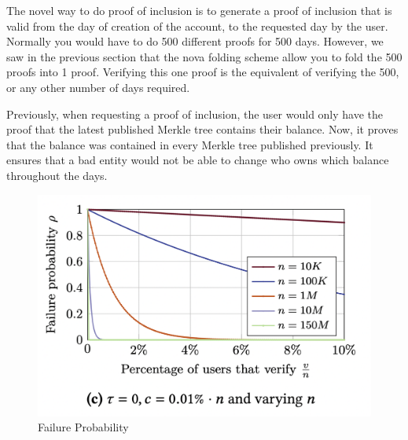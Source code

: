 The novel way to do proof of inclusion is to generate a proof of inclusion that is valid from the day of creation of the account, to the requested day by the user. 
Normally you would have to do 500 different proofs for 500 days. However, we saw in the previous section that the nova folding scheme allow you to fold the 500 proofs into 1 proof.
Verifying this one proof is the equivalent of verifying the 500, or any other number of days required. 

Previously, when requesting a proof of inclusion, the user would only have the proof that the latest published Merkle tree contains their balance. 
Now, it proves that the balance was contained in every Merkle tree published previously. 
It ensures that a bad entity would not be able to change who owns which balance throughout the days. 

\begin{figure}[H]
    \centering
    \includegraphics[width=130mm]{FailureProbability.png}
    \caption{Failure Probability \cite{GP21}}
    \label{overflow}
    \end{figure}

